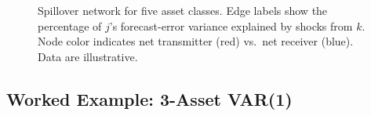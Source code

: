 \begin{figure}[ht]
\caption{Spillover network for five asset classes.  Edge labels show the percentage
of $j$'s forecast-error variance explained by shocks from $k$.  Node color indicates
net transmitter (red) vs.\ net receiver (blue).  Data are illustrative.}
\label{fig:spillover-network}
\end{figure}

\subsection{Worked Example: 3-Asset VAR(1)}

